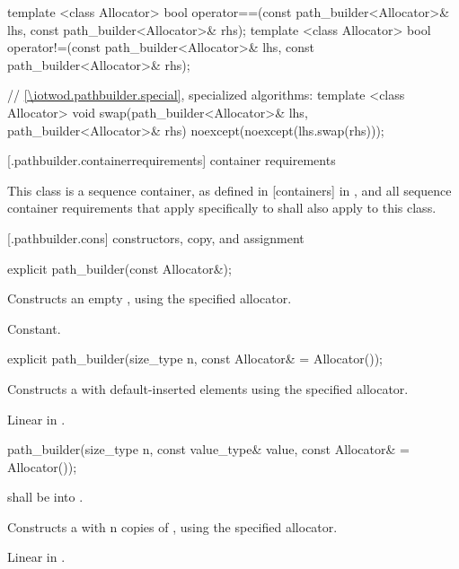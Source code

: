 \begin{codeblock}
{  template <class Allocator>
  bool operator==(const path_builder<Allocator>& lhs, 
    const path_builder<Allocator>& rhs);
  template <class Allocator>
  bool operator!=(const path_builder<Allocator>& lhs, 
    const path_builder<Allocator>& rhs);
  
  // \ref{\iotwod.pathbuilder.special}, specialized algorithms:
  template <class Allocator>
  void swap(path_builder<Allocator>& lhs, path_builder<Allocator>& rhs)
    noexcept(noexcept(lhs.swap(rhs)));
}
\end{codeblock}

 [\iotwod.pathbuilder.containerrequirements] { container requirements}

\pnum
This class is a sequence container, as defined in [containers] in \cppseventeen, and all sequence container requirements that apply specifically to  shall also apply to this class.

 [\iotwod.pathbuilder.cons] { constructors, copy, and assignment}

%
\begin{itemdecl}
explicit path_builder(const Allocator&);
\end{itemdecl}
\begin{itemdescr}
\pnum
\effects
Constructs an empty , using the specified allocator.

\pnum
\complexity
Constant.
\end{itemdescr}

%
\begin{itemdecl}
explicit path_builder(size_type n, const Allocator& = Allocator());
\end{itemdecl}
\begin{itemdescr}
\pnum
\effects
Constructs a  with  default-inserted elements using the specified allocator.

\pnum
\complexity
Linear in .
\end{itemdescr}

%
\begin{itemdecl}
path_builder(size_type n, const value_type& value,
  const Allocator& = Allocator());
\end{itemdecl}
\begin{itemdescr}
\pnum
\requires
{} shall be  into .

\pnum
\effects
Constructs a  with n copies of , using the specified allocator.

\pnum
\complexity
Linear in .
\end{itemdescr}

